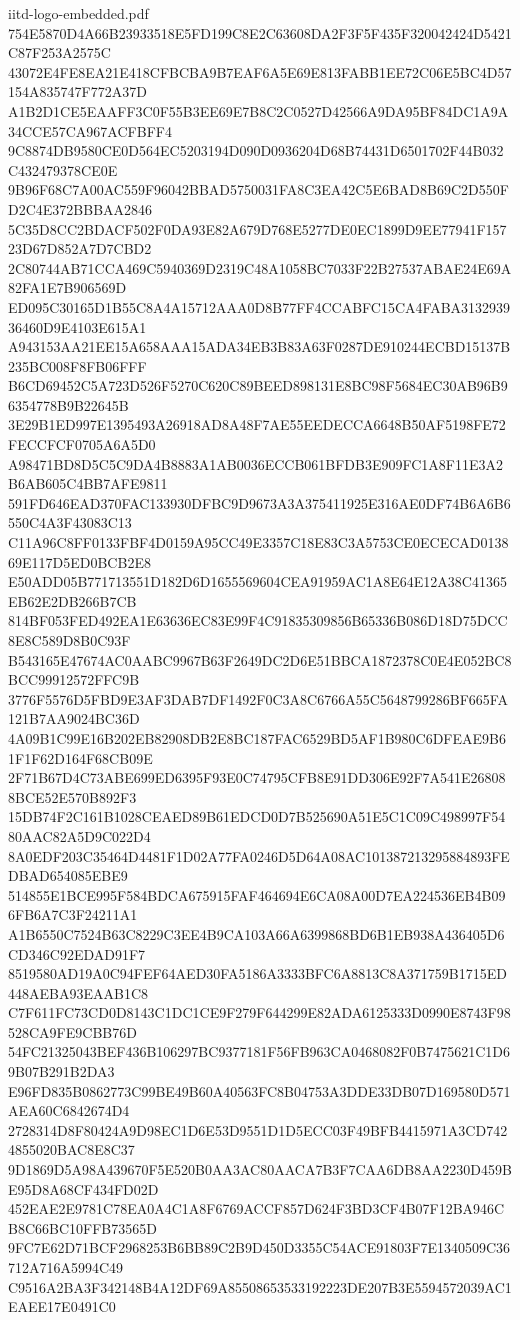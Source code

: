 \begin{filecontents*}[overwrite]{iitd-logo-embedded.pdf}
754E5870D4A66B23933518E5FD199C8E2C63608DA2F3F5F435F320042424D5421C87F253A2575C
43072E4FE8EA21E418CFBCBA9B7EAF6A5E69E813FABB1EE72C06E5BC4D57154A835747F772A37D
A1B2D1CE5EAAFF3C0F55B3EE69E7B8C2C0527D42566A9DA95BF84DC1A9A34CCE57CA967ACFBFF4
9C8874DB9580CE0D564EC5203194D090D0936204D68B74431D6501702F44B032C432479378CE0E
9B96F68C7A00AC559F96042BBAD5750031FA8C3EA42C5E6BAD8B69C2D550FD2C4E372BBBAA2846
5C35D8CC2BDACF502F0DA93E82A679D768E5277DE0EC1899D9EE77941F15723D67D852A7D7CBD2
2C80744AB71CCA469C5940369D2319C48A1058BC7033F22B27537ABAE24E69A82FA1E7B906569D
ED095C30165D1B55C8A4A15712AAA0D8B77FF4CCABFC15CA4FABA313293936460D9E4103E615A1
A943153AA21EE15A658AAA15ADA34EB3B83A63F0287DE910244ECBD15137B235BC008F8FB06FFF
B6CD69452C5A723D526F5270C620C89BEED898131E8BC98F5684EC30AB96B96354778B9B22645B
3E29B1ED997E1395493A26918AD8A48F7AE55EEDECCA6648B50AF5198FE72FECCFCF0705A6A5D0
A98471BD8D5C5C9DA4B8883A1AB0036ECCB061BFDB3E909FC1A8F11E3A2B6AB605C4BB7AFE9811
591FD646EAD370FAC133930DFBC9D9673A3A375411925E316AE0DF74B6A6B6550C4A3F43083C13
C11A96C8FF0133FBF4D0159A95CC49E3357C18E83C3A5753CE0ECECAD013869E117D5ED0BCB2E8
E50ADD05B771713551D182D6D1655569604CEA91959AC1A8E64E12A38C41365EB62E2DB266B7CB
814BF053FED492EA1E63636EC83E99F4C91835309856B65336B086D18D75DCC8E8C589D8B0C93F
B543165E47674AC0AABC9967B63F2649DC2D6E51BBCA1872378C0E4E052BC8BCC99912572FFC9B
3776F5576D5FBD9E3AF3DAB7DF1492F0C3A8C6766A55C5648799286BF665FA121B7AA9024BC36D
4A09B1C99E16B202EB82908DB2E8BC187FAC6529BD5AF1B980C6DFEAE9B61F1F62D164F68CB09E
2F71B67D4C73ABE699ED6395F93E0C74795CFB8E91DD306E92F7A541E268088BCE52E570B892F3
15DB74F2C161B1028CEAED89B61EDCD0D7B525690A51E5C1C09C498997F5480AAC82A5D9C022D4
8A0EDF203C35464D4481F1D02A77FA0246D5D64A08AC101387213295884893FEDBAD654085EBE9
514855E1BCE995F584BDCA675915FAF464694E6CA08A00D7EA224536EB4B096FB6A7C3F24211A1
A1B6550C7524B63C8229C3EE4B9CA103A66A6399868BD6B1EB938A436405D6CD346C92EDAD91F7
8519580AD19A0C94FEF64AED30FA5186A3333BFC6A8813C8A371759B1715ED448AEBA93EAAB1C8
C7F611FC73CD0D8143C1DC1CE9F279F644299E82ADA6125333D0990E8743F98528CA9FE9CBB76D
54FC21325043BEF436B106297BC9377181F56FB963CA0468082F0B7475621C1D69B07B291B2DA3
E96FD835B0862773C99BE49B60A40563FC8B04753A3DDE33DB07D169580D571AEA60C6842674D4
2728314D8F80424A9D98EC1D6E53D9551D1D5ECC03F49BFB4415971A3CD7424855020BAC8E8C37
9D1869D5A98A439670F5E520B0AA3AC80AACA7B3F7CAA6DB8AA2230D459BE95D8A68CF434FD02D
452EAE2E9781C78EA0A4C1A8F6769ACCF857D624F3BD3CF4B07F12BA946CB8C66BC10FFB73565D
9FC7E62D71BCF2968253B6BB89C2B9D450D3355C54ACE91803F7E1340509C36712A716A5994C49
C9516A2BA3F342148B4A12DF69A85508653533192223DE207B3E5594572039AC1EAEE17E0491C0

\end{filecontents*}
